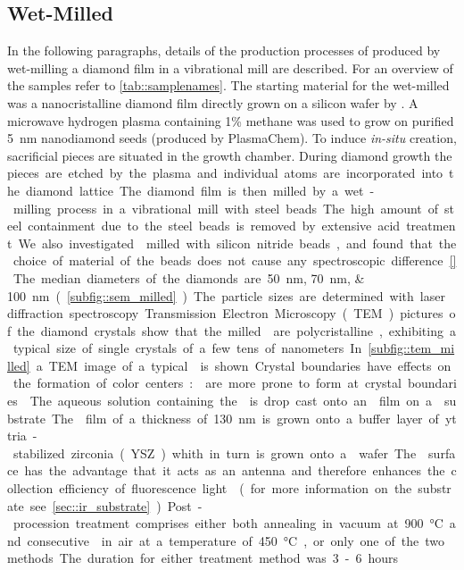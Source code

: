 	\subsection{Wet-Milled \cvd \Nds}\label{subsec::milled_nds}
	In the following paragraphs, details of the production processes of \nd produced by wet-milling a \CVD diamond film in a vibrational mill are described.
	For an overview of the samples refer to \autoref{tab::samplenames}.
	The starting material for the wet-milled \nds was a nanocristalline diamond film \cite{Williams2006a} directly grown on a silicon wafer by \CVD.
	A microwave hydrogen plasma containing 1\% methane was used to grow on purified \SI{5}{\nano\meter} nanodiamond seeds (produced by PlasmaChem).
	To induce \textit{in-situ} \siv creation, sacrificial \Si pieces are situated in the growth chamber.
	During diamond growth the \si pieces are etched by the plasma and individual atoms are incorporated into the diamond lattice.
	The diamond film is then milled by a wet-milling process in a vibrational mill with steel beads.
	The high amount of steel containment due to the steel beads is removed by extensive acid treatment.
	We also investigated \nds milled with silicon nitride beads, and found that the choice of material of the beads does not cause any spectroscopic difference \autoref{}.
	The median diameters of the diamonds are \SIlist{50; 70; 100}{\nano\meter} (\autoref{subfig::sem_milled}).
	The particle sizes are determined with laser diffraction spectroscopy.
	Transmission Electron Microscopy (TEM) pictures of the diamond crystals show that the milled \nds are polycristalline, exhibiting a typical size of single crystals of a few tens of nanometers.
	In \autoref{subfig::tem_milled} a TEM image of a typical \nd is shown.
	Crystal boundaries have effects on the formation of color centers:
	\sivs are more prone to form at crystal boundaries \cite{Zapol2001}.
	The aqueous solution containing the \nds is drop cast onto an \ir film on a \Si substrate.
	The \ir film of a thickness of \SI{130}{nm} is grown onto a buffer layer of yttria-stabilized zirconia (YSZ) whith in turn is grown onto a \Si wafer.
	The \ir surface has the advantage that it acts as an antenna and therefore enhances the collection efficiency of fluorescence light \cite{Neu2012a} (for more information on the substrate see \autoref{sec::ir_substrate}).
	Post-procession treatment comprises either both annealing in vacuum at \SI{900}{\degreeCelsius} and consecutive \ox in air at a temperature of \SI{450}{\degreeCelsius}, or only one of the two methods.
	The duration for either treatment method was 3-6 hours.
	\\
